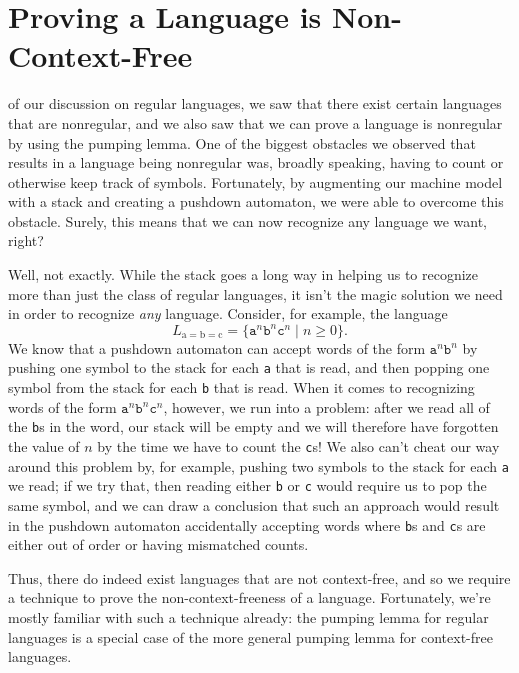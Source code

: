 \section{Proving a Language is Non-Context-Free}\label{sec:noncontextfree}

 of our discussion on regular languages, we saw that there exist certain languages that are nonregular, and we also saw that we can prove a language is nonregular by using the pumping lemma. One of the biggest obstacles we observed that results in a language being nonregular was, broadly speaking, having to count or otherwise keep track of symbols. Fortunately, by augmenting our machine model with a stack and creating a pushdown automaton, we were able to overcome this obstacle. Surely, this means that we can now recognize any language we want, right?

Well, not exactly. While the stack goes a long way in helping us to recognize more than just the class of regular languages, it isn't the magic solution we need in order to recognize \emph{any} language. Consider, for example, the language
\begin{equation*}
L_{\text{a}=\text{b}=\text{c}} = \{\texttt{a}^{n}\texttt{b}^{n}\texttt{c}^{n} \mid n \geq 0\}.
\end{equation*}
We know that a pushdown automaton can accept words of the form $\texttt{a}^{n}\texttt{b}^{n}$ by pushing one symbol to the stack for each \texttt{a} that is read, and then popping one symbol from the stack for each \texttt{b} that is read. When it comes to recognizing words of the form $\texttt{a}^{n}\texttt{b}^{n}\texttt{c}^{n}$, however, we run into a problem: after we read all of the \texttt{b}s in the word, our stack will be empty and we will therefore have forgotten the value of $n$ by the time we have to count the \texttt{c}s! We also can't cheat our way around this problem by, for example, pushing two symbols to the stack for each \texttt{a} we read; if we try that, then reading either \texttt{b} or \texttt{c} would require us to pop the same symbol, and we can draw a conclusion that such an approach would result in the pushdown automaton accidentally accepting words where \texttt{b}s and \texttt{c}s are either out of order or having mismatched counts.

Thus, there do indeed exist languages that are not context-free, and so we require a technique to prove the non-context-freeness of a language. Fortunately, we're mostly familiar with such a technique already: the pumping lemma for regular languages is a special case of the more general pumping lemma for context-free languages.


